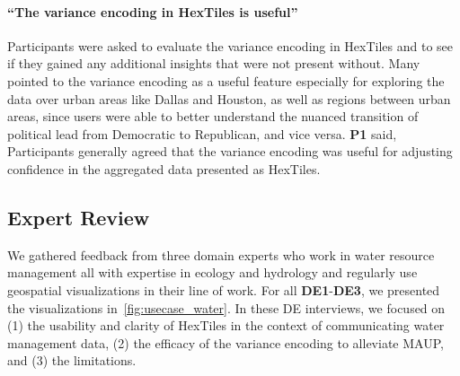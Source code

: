 \paragraph{``The variance encoding in HexTiles is useful''}
Participants were asked to evaluate the variance encoding in HexTiles and to see if they gained any additional insights that were not present without.
%
Many pointed to the variance encoding as a useful feature especially for exploring the data over urban areas like Dallas and Houston, as well as regions between urban areas, since users were able to better understand the nuanced transition of political lead from Democratic to Republican, and vice versa.
%
\textbf{P1} said, 
%
Participants generally agreed that the variance encoding was useful for adjusting confidence in the aggregated data presented as HexTiles.







\subsection{Expert Review}
We gathered feedback from three domain experts who work in water resource management all with expertise in ecology and hydrology and regularly use geospatial visualizations in their line of work.
%
%
For all \textbf{DE1}-\textbf{DE3}, we presented the visualizations in~\cref{fig:usecase_water}.
%
In these DE interviews, we focused on (1) the usability and clarity of HexTiles in the context of communicating water management data, (2) the efficacy of the variance encoding to alleviate MAUP, and (3) the limitations.
%


